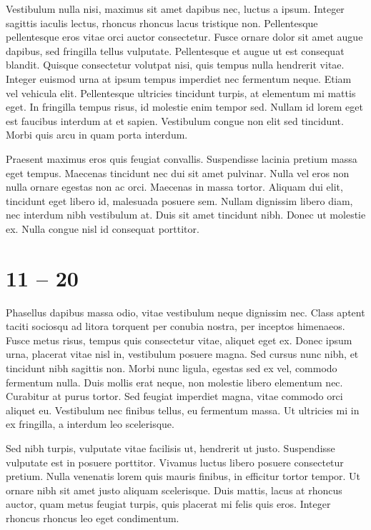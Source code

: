 \documentclass[12pt, a4paper]{article}
\begin{document}
Vestibulum nulla nisi, maximus sit amet dapibus nec, luctus a ipsum. Integer sagittis iaculis lectus, rhoncus rhoncus lacus tristique non. Pellentesque pellentesque eros vitae orci auctor consectetur. Fusce ornare dolor sit amet augue dapibus, sed fringilla tellus vulputate. Pellentesque et augue ut est consequat blandit. Quisque consectetur volutpat nisi, quis tempus nulla hendrerit vitae. Integer euismod urna at ipsum tempus imperdiet nec fermentum neque. Etiam vel vehicula elit. Pellentesque ultricies tincidunt turpis, at elementum mi mattis eget. In fringilla tempus risus, id molestie enim tempor sed. Nullam id lorem eget est faucibus interdum at et sapien. Vestibulum congue non elit sed tincidunt. Morbi quis arcu in quam porta interdum.

Praesent maximus eros quis feugiat convallis. Suspendisse lacinia pretium massa eget tempus. Maecenas tincidunt nec dui sit amet pulvinar. Nulla vel eros non nulla ornare egestas non ac orci. Maecenas in massa tortor. Aliquam dui elit, tincidunt eget libero id, malesuada posuere sem. Nullam dignissim libero diam, nec interdum nibh vestibulum at. Duis sit amet tincidunt nibh. Donec ut molestie ex. Nulla congue nisl id consequat porttitor.

\section{11 -- 20}

Phasellus dapibus massa odio, vitae vestibulum neque dignissim nec. Class aptent taciti sociosqu ad litora torquent per conubia nostra, per inceptos himenaeos. Fusce metus risus, tempus quis consectetur vitae, aliquet eget ex. Donec ipsum urna, placerat vitae nisl in, vestibulum posuere magna. Sed cursus nunc nibh, et tincidunt nibh sagittis non. Morbi nunc ligula, egestas sed ex vel, commodo fermentum nulla. Duis mollis erat neque, non molestie libero elementum nec. Curabitur at purus tortor. Sed feugiat imperdiet magna, vitae commodo orci aliquet eu. Vestibulum nec finibus tellus, eu fermentum massa. Ut ultricies mi in ex fringilla, a interdum leo scelerisque.

Sed nibh turpis, vulputate vitae facilisis ut, hendrerit ut justo. Suspendisse vulputate est in posuere porttitor. Vivamus luctus libero posuere consectetur pretium. Nulla venenatis lorem quis mauris finibus, in efficitur tortor tempor. Ut ornare nibh sit amet justo aliquam scelerisque. Duis mattis, lacus at rhoncus auctor, quam metus feugiat turpis, quis placerat mi felis quis eros. Integer rhoncus rhoncus leo eget condimentum.
\end{document}
